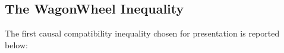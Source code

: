 \documentclass[aps, 10pt, english, twoside, pra, nofootinbib, tightenlines, longbibliography, superscriptaddress]{revtex4-1}
\begin{document}
    \subsection{The WagonWheel Inequality}
    The first causal compatibility inequality chosen for presentation is reported below:
\end{document}
